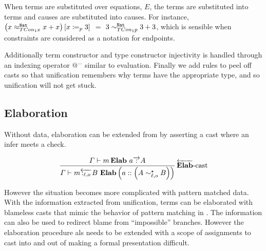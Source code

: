 
When terms are substituted over equations, $E$, the terms are substituted into terms and causes are substituted into causes.
For instance, 
  $\left(x \approx_{TCon_{1}x}^{\mathtt{Nat}{}}x+x\right) \left[x\coloneqq_{p} 3\right]$ $=$ $3 \sim_{TCon_{1}p}^{\mathtt{Nat}{}}3+3$,
  which is sensible when constraints are considered as a notation for endpoints.

Additionally term constructor and type constructor injectivity is handled through an indexing operator $@^{...}$ similar to evaluation.
Finally we add rules to peel off casts so that unification remembers why terms have the appropriate type, and so unification will not get stuck.

\subsection{Elaboration}
Without data, elaboration can be extended from  by asserting a cast where an infer meets a check.

\[
\frac{\varGamma\vdash m\,\textbf{Elab}\ a\overrightarrow{\,:\,}A}{\varGamma\vdash m\overleftarrow{\,:_{\ell,o}\,}B\ \textbf{Elab}\left(a::\left(A\sim_{\ell,o}^{\star}B\right)\right)}
\rulename{\overleftarrow{\textbf{Elab}}-cast}
\]

However the situation becomes more complicated with pattern matched data.
With the information extracted from unification, terms can be elaborated with blameless casts that mimic the behavior of pattern matching in .
The information can also be used to redirect blame from ``impossible'' branches.
However the elaboration procedure als needs to be extended with a scope of assignments to cast into and out of making a formal presentation difficult.